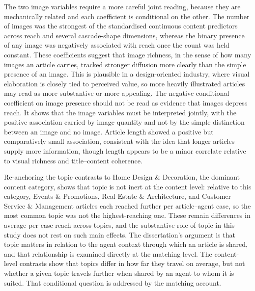 The two image variables require a more careful joint reading, because they are mechanically related and each coefficient is conditional on the other. The number of images was the strongest of the standardised continuous content predictors across reach and several cascade-shape dimensions, whereas the binary presence of any image was negatively associated with reach once the count was held constant. These coefficients suggest that image richness, in the sense of how many images an article carries, tracked stronger diffusion more clearly than the simple presence of an image. This is plausible in a design-oriented industry, where visual elaboration is closely tied to perceived value, so more heavily illustrated articles may read as more substantive or more appealing. The negative conditional coefficient on image presence should not be read as evidence that images depress reach. It shows that the image variables must be interpreted jointly, with the positive association carried by image quantity and not by the simple distinction between an image and no image. Article length showed a positive but comparatively small association, consistent with the idea that longer articles supply more information, though length appears to be a minor correlate relative to visual richness and title–content coherence.

Re-anchoring the topic contrasts to Home Design \& Decoration, the dominant content category, shows that topic is not inert at the content level: relative to this category, Events \& Promotions, Real Estate \& Architecture, and Customer Service \& Management articles each reached further per article–agent case, so the most common topic was not the highest-reaching one. These remain differences in average per-case reach across topics, and the substantive role of topic in this study does not rest on such main effects. The dissertation's argument is that topic matters in relation to the agent context through which an article is shared, and that relationship is examined directly at the matching level. The content-level contrasts show that topics differ in how far they travel on average, but not whether a given topic travels further when shared by an agent to whom it is suited. That conditional question is addressed by the matching account.

